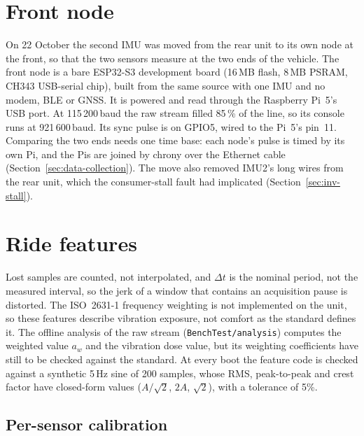 \section{Front node}
\label{sec:impl-front}

On 22 October the second IMU was moved from the rear unit to its own node at the front, so that the two sensors measure at the two ends of the vehicle. The front node is a bare ESP32-S3 development board (16\,MB flash, 8\,MB PSRAM, CH343 USB-serial chip), built from the same source with one IMU and no modem, BLE or GNSS. It is powered and read through the Raspberry Pi~5's USB port. At 115\,200\,baud the raw stream filled 85\,\% of the line, so its console runs at 921\,600\,baud. Its sync pulse is on GPIO5, wired to the Pi~5's pin~11. Comparing the two ends needs one time base: each node's pulse is timed by its own Pi, and the Pis are joined by chrony over the Ethernet cable (Section~\ref{sec:data-collection}). The move also removed IMU2's long wires from the rear unit, which the consumer-stall fault had implicated (Section~\ref{sec:inv-stall}).

\section{Ride features}
\label{sec:impl-ride}

Lost samples are counted, not interpolated, and $\Delta t$ is the nominal period, not the measured interval, so the jerk of a window that contains an acquisition pause is distorted. The ISO~2631-1 frequency weighting is not implemented on the unit, so these features describe vibration exposure, not comfort as the standard defines it. The offline analysis of the raw stream (\texttt{BenchTest/analysis}) computes the weighted value $a_w$ and the vibration dose value, but its weighting coefficients have still to be checked against the standard. At every boot the feature code is checked against a synthetic 5\,Hz sine of 200 samples, whose RMS, peak-to-peak and crest factor have closed-form values ($A/\sqrt{2}$, $2A$, $\sqrt{2}$), with a tolerance of 5\%.

\subsection{Per-sensor calibration}
\label{sec:impl-cal}

